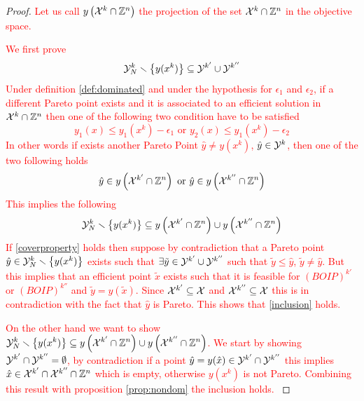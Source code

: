 \documentclass[preprint,12pt]{elsarticle}
\newcommand{\red}[1]{\textcolor{red}{#1}}
\def\setZn{\mathbb{Z}^n}
\def\ds{\displaystyle}
\def\eps{\epsilon}
\begin{document}
\begin{proof}
\red{Let us call $y\left( {\cal X}^k \cap \setZn \right)$ the projection of the set  ${\cal X}^k \cap \setZn$ in the objective space. }

\red{We first prove
\begin{equation}\label{inclusion}
    {\cal Y}^k_N \smallsetminus \left\{ y(x^k) \right\} \subseteq {\cal Y}^{k'} \cup {\cal Y}^{k''}
\end{equation}
Under definition \ref{def:dominated} and under the hypothesis for $\eps_1$ and $\eps_2$, if a different Pareto point exists and it is associated to an efficient solution in ${\cal X}^k \cap \setZn$ then one of the following two condition have to be satisfied
$$ y_1 (x) \le y_1(x^k) - \eps_1  \text{ or } y_2 (x) \le y_1(x^k) - \eps_2 $$
In other words if exists another Pareto Point $\hat{y} \neq y(x^k)$, $\hat{y} \in {\cal Y}^k$, then one of the two following holds
$$\hat{y} \in  y\left( {\cal X}^{k'} \cap \setZn \right) \text{ or } \hat{y} \in  y\left( {\cal X}^{k''} \cap \setZn \right) $$
This implies the following
\begin{equation}\label{coverproperty}
   {\cal Y}^k_N \smallsetminus \left\{ y(x^k) \right\} \subseteq  y\left( {\cal X}^{k'} \cap \setZn \right) \cup y\left( {\cal X}^{k''} \cap \setZn \right) 
\end{equation}
If \eqref{coverproperty} holds then suppose by contradiction that a Pareto point $\hat{y} \in {\cal Y}^k_N \smallsetminus \left\{ y(x^k) \right\}$ exists such that $\exists \tilde{y} \in {\cal Y}^{k'} \cup {\cal Y}^{k''}$ such that $\tilde{y} \le \hat{y}$, $ \tilde{y} \neq \hat{y}$. But this implies that an efficient point $\tilde{x}$ exists such that it is feasible for $(BOIP)^{k'}$ or $(BOIP)^{k''}$ and $\tilde{y} = y (\tilde{x})$. Since ${\cal X}^{k'} \subseteq {\cal X}$ and ${\cal X}^{k''} \subseteq {\cal X}$ this is in contradiction with the fact that $\hat{y}$ is Pareto. This shows that \eqref{inclusion} holds.
}


\red{
On the other hand we want to show $\ds {\cal Y}^k_N \smallsetminus \left\{ y(x^k) \right\} \subseteq  y\left( {\cal X}^{k'} \cap \setZn \right) \cup y\left( {\cal X}^{k''} \cap \setZn \right)$.%
We start by showing $\ds {\cal Y}^{k'} \cap {\cal Y}^{k''} = \emptyset$, by contradiction if a point $\hat{y} = y(\hat{x}) \in {\cal Y}^{k'} \cap {\cal Y}^{k''} $ this implies $\hat{x} \in {\cal X}^{k'} \cap {\cal X}^{k''} \cap \setZn$ which is empty, otherwise $y(x^k)$ is not Pareto. Combining this result with proposition \ref{prop:nondom} the inclusion holds. 
}
\end{proof}
\end{document}
